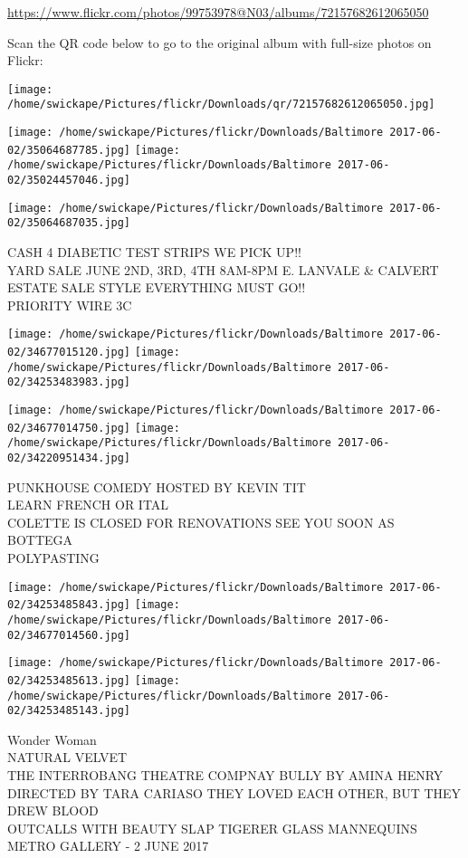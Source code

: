 \documentclass[10pt,letterpaper]{article}
\begin{document}
\url{https://www.flickr.com/photos/99753978@N03/albums/72157682612065050}

Scan the QR code below to go to the original album with full-size photos on Flickr:

\texttt{[image: /home/swickape/Pictures/flickr/Downloads/qr/72157682612065050.jpg]}
\pagebreak

\texttt{[image: /home/swickape/Pictures/flickr/Downloads/Baltimore 2017-06-02/35064687785.jpg]}
\texttt{[image: /home/swickape/Pictures/flickr/Downloads/Baltimore 2017-06-02/35024457046.jpg]}

\vspace{0.25in}
\texttt{[image: /home/swickape/Pictures/flickr/Downloads/Baltimore 2017-06-02/35064687035.jpg]}

CASH 4 DIABETIC TEST STRIPS WE PICK UP!!\\
YARD SALE JUNE 2ND, 3RD, 4TH 8AM{-}8PM E. LANVALE \& CALVERT ESTATE SALE STYLE EVERYTHING MUST GO!!\\
PRIORITY WIRE 3C
\pagebreak

\texttt{[image: /home/swickape/Pictures/flickr/Downloads/Baltimore 2017-06-02/34677015120.jpg]}
\texttt{[image: /home/swickape/Pictures/flickr/Downloads/Baltimore 2017-06-02/34253483983.jpg]}

\texttt{[image: /home/swickape/Pictures/flickr/Downloads/Baltimore 2017-06-02/34677014750.jpg]}
\texttt{[image: /home/swickape/Pictures/flickr/Downloads/Baltimore 2017-06-02/34220951434.jpg]}

PUNKHOUSE COMEDY HOSTED BY KEVIN TIT\\
LEARN FRENCH OR ITAL\\
COLETTE IS CLOSED FOR RENOVATIONS SEE YOU SOON AS BOTTEGA\\
POLYPASTING
\pagebreak

\texttt{[image: /home/swickape/Pictures/flickr/Downloads/Baltimore 2017-06-02/34253485843.jpg]}
\texttt{[image: /home/swickape/Pictures/flickr/Downloads/Baltimore 2017-06-02/34677014560.jpg]}

\texttt{[image: /home/swickape/Pictures/flickr/Downloads/Baltimore 2017-06-02/34253485613.jpg]}
\texttt{[image: /home/swickape/Pictures/flickr/Downloads/Baltimore 2017-06-02/34253485143.jpg]}

Wonder Woman\\
NATURAL VELVET\\
THE INTERROBANG THEATRE COMPNAY BULLY BY AMINA HENRY DIRECTED BY TARA CARIASO THEY LOVED EACH OTHER, BUT THEY DREW BLOOD\\
OUTCALLS WITH BEAUTY SLAP TIGERER GLASS MANNEQUINS METRO GALLERY {-} 2 JUNE 2017
\pagebreak
\end{document}
